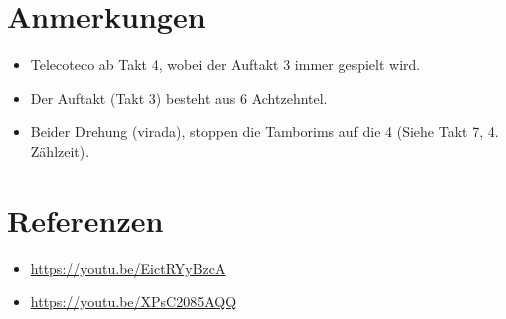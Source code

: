 \documentclass[a4paper,12pt]{article}
\begin{document}
\section*{Anmerkungen}
\begin{itemize}
 \item Telecoteco ab Takt 4, wobei der Auftakt 3 immer gespielt wird. 
 \item Der Auftakt (Takt 3) besteht aus 6 Achtzehntel.
 \item Beider Drehung (virada), stoppen die Tamborims auf die 4 (Siehe Takt 7, 4. Zählzeit).
\end{itemize}

\section*{Referenzen}
\footnotesize
\begin{itemize}
 \item \url{https://youtu.be/EictRYyBzcA}
 \item \url{https://youtu.be/XPsC2085AQQ}
\end{itemize}
\end{document}
